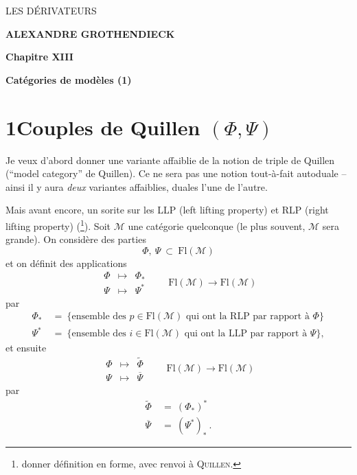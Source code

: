 \documentclass[11pt]{article}
\newcommand{\printedpage}[1]{\marginpar{\footnotesize p.~#1}}
\newcommand{\msp}[1]{\marginpar{\footnotesize [#1]}}
\newcommand{\Fl}{\mathrm{Fl}}
\newcommand{\M}{\mathcal{M}}
\begin{document}
\printedpage{--} %

\begin{center}
\vspace*{5cm}
{\LARGE\sffamily LES DÉRIVATEURS}

\vspace{1.5cm}
{\large\textbf{ALEXANDRE GROTHENDIECK}}

\vspace{2.5cm}
{\large\textbf{Chapitre XIII}}

\vspace{0.5cm}
{\large\textbf{Catégories de modèles (1)}}
\end{center}

\clearpage


\printedpage{1}

\msp{page 1}

\section*{1\quad Couples de Quillen $(\Phi, \Psi)$}

Je veux d'abord donner une variante affaiblie de la notion de triple de Quillen (``model category'' de Quillen). Ce ne sera pas une notion tout-à-fait autoduale -- ainsi il y aura \textit{deux} variantes affaiblies, duales l'une de l'autre.

Mais avant encore, un sorite sur les LLP (left lifting property) et RLP (right lifting property) (\footnote[1]{donner définition en forme, avec renvoi à \textsc{Quillen}.}). Soit $\M$ une catégorie quelconque (le plus souvent, $\M$ sera grande). On considère des parties
\[
\Phi,\ \Psi\ \subset\ \Fl(\M)
\]
et on définit des applications
\[
\boxed{\begin{array}{ccc}
\Phi & \longmapsto & \Phi_* \\[1ex]
\Psi & \longmapsto & \Psi^*
\end{array}}
\qquad
\Fl(\M) \longrightarrow \Fl(\M)
\]
 par %
\[
\begin{aligned}
\Phi_* \ &= \ \{\text{ensemble des } p \in \Fl(\M) \text{ qui ont la RLP par rapport à } \Phi\} \\
\Psi^* \ &= \ \{\text{ensemble des } i \in \Fl(\M) \text{ qui ont la LLP par rapport à } \Psi\},
\end{aligned}
\]
et ensuite
\[
\boxed{\begin{array}{ccc}
\Phi & \longmapsto & \widetilde{\Phi} \\[1ex]
\Psi & \longmapsto & \overline{\Psi}
\end{array}}
\qquad
\Fl(\M) \longrightarrow \Fl(\M)
\]
 par %
\[
\begin{aligned}
\widetilde{\Phi} \ &= \ (\Phi_*)^* \\
\overline{\Psi} \ &= \ (\Psi^*)_* \ .
\end{aligned}
\]
\end{document}
